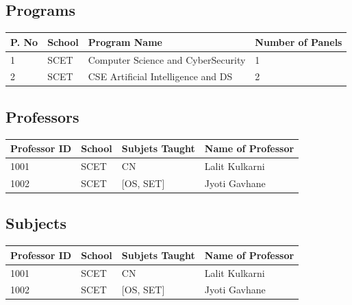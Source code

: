 \documentclass[11pt]{article}
\begin{document}
\subsection{Programs}

\begin{table}[H]
	\begin{tabular}{|l|l|l|l|}
		\hline
		\textbf{P. No } & \textbf{School } & \textbf{Program Name                       } & \textbf{Number of  Panels } \\ \hline
		1               & SCET             & Computer Science and CyberSecurity           & 1                           \\ \hline
		2               & SCET             & CSE Artificial Intelligence and DS           & 2                           \\ \hline
	\end{tabular}
\end{table}

\subsection{Professors}
\begin{table}[H]
	\begin{tabular}{|l|l|l|l|}
		\hline
		\textbf{Professor ID } & \textbf{School } & \textbf{Subjets Taught } & \textbf{Name of Professor } \\ \hline
		1001                   & SCET             & CN                       & Lalit Kulkarni              \\ \hline
		1002                   & SCET             & {[}OS, SET{]}            & Jyoti Gavhane               \\ \hline
	\end{tabular}
\end{table}
\subsection{Subjects}

\begin{table}[H]
	\begin{tabular}{|l|l|l|l|}
		\hline
		\textbf{Professor ID } & \textbf{School } & \textbf{Subjets Taught } & \textbf{Name of Professor } \\ \hline
		1001                   & SCET             & CN                       & Lalit Kulkarni              \\ \hline
		1002                   & SCET             & {[}OS, SET{]}            & Jyoti Gavhane               \\ \hline
	\end{tabular}
\end{table}
\end{document}

